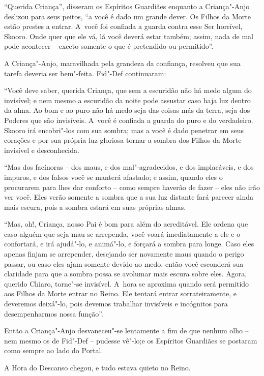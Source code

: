 ``Querida Criança'', disseram os Espíritos Guardiães enquanto a
Criança"-Anjo deslizou para seus peitos, ``a você é dado um grande dever.
Os Filhos da Morte estão prestes a entrar. A~você foi confiada a guarda
contra esse Ser horrível, Skooro. Onde quer que ele vá, lá você deverá
estar também; assim, nada de mal pode acontecer -- exceto somente o que
é pretendido ou permitido''.

A Criança"-Anjo, maravilhada pela grandeza da confiança, resolveu que sua
tarefa deveria ser bem"-feita. Fid"-Def continuaram:

``Você deve saber, querida Criança, que sem a escuridão não há medo
algum do invisível; e nem mesmo a escuridão da noite pode assustar caso
haja luz dentro da alma. Ao bom e ao puro não há medo seja das coisas
más da terra, seja dos Poderes que são invisíveis. A~você é confiada a
guarda do puro e do verdadeiro. Skooro irá encobri"-los com sua sombra;
mas a você é dado penetrar em seus corações e por sua própria luz
gloriosa tornar a sombra dos Filhos da Morte invisível e desconhecida.

``Mas dos facínoras -- dos maus, e dos mal"-agradecidos, e dos
implacáveis, e dos impuros, e dos falsos você se manterá afastado; e
assim, quando eles o procurarem para lhes dar conforto -- como sempre
haverão de fazer -- eles não irão ver você. Eles verão somente a sombra
que a sua luz distante fará parecer ainda mais escura, pois a sombra
estará em suas próprias almas.

``Mas, oh!, Criança, nosso Pai é bom para além do acreditável. Ele
ordena que caso alguém que seja mau se arrependa, você voará
imediatamente a ele e o confortará, e irá ajudá"-lo, e animá"-lo, e
forçará a sombra para longe. Caso eles apenas finjam se arrepender,
desejando ser novamente maus quando o perigo passar, ou caso eles ajam
somente devido ao medo, então você esconderá sua claridade para que a
sombra possa se avolumar mais escura sobre eles. Agora, querido Chiaro,
torne"-se invisível. A~hora se aproxima quando será permitido aos Filhos
da Morte entrar no Reino. Ele tentará entrar sorrateiramente, e
deveremos deixá"-lo, pois devemos trabalhar invisíveis e incógnitos para
desempenharmos nossa função''.

Então a Criança"-Anjo desvaneceu"-se lentamente a fim de que nenhum olho
-- nem mesmo os de Fid"-Def -- pudesse vê"-lo;e os Espíritos Guardiães se
postaram como sempre ao lado do Portal.

A Hora do Descanso chegou, e tudo estava quieto no Reino.

